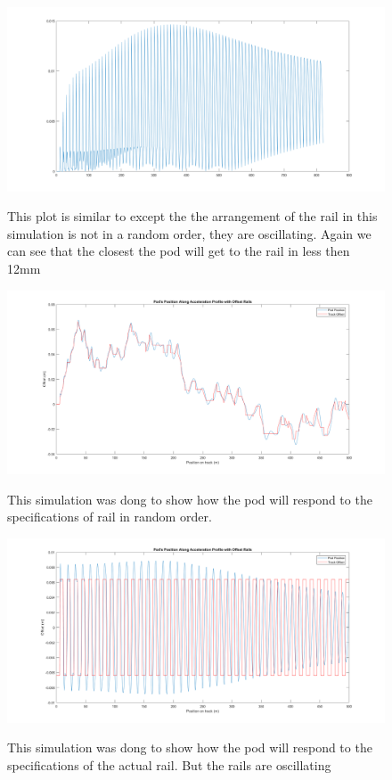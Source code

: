 \documentclass[main.tex]{subfiles}
\begin{document}
    \begin{figure}[H]
        	\centering
        \includegraphics[width=\linewidth]{images/OscillatingMaxDistToRail}
        \label{fig:OMaxDistRail}
        \caption{This plot is similar to  except the the arrangement of the rail in this simulation is not in a random order, they are oscillating. Again we can see that the closest the pod will get to the rail in less then 12mm }
    \end{figure}
    
    
    \begin{figure}[H]
    	\centering
        \includegraphics[width=\linewidth]{images/RandPodLateralResponse}
        \label{fig:RandpodLateralResponse}
        \caption{This simulation was dong to show how the pod will respond to the specifications of rail in random order.}
    \end{figure}
    \begin{figure}[H]
    	\centering
        \includegraphics[width=\linewidth]{images/OscillatingPodLateralResponse}
        \label{fig:OPodLateralRespnse}
        \caption{This simulation was dong to show how the pod will respond to the specifications of the actual rail. But the rails are oscillating}
    \end{figure}    
\end{document}
